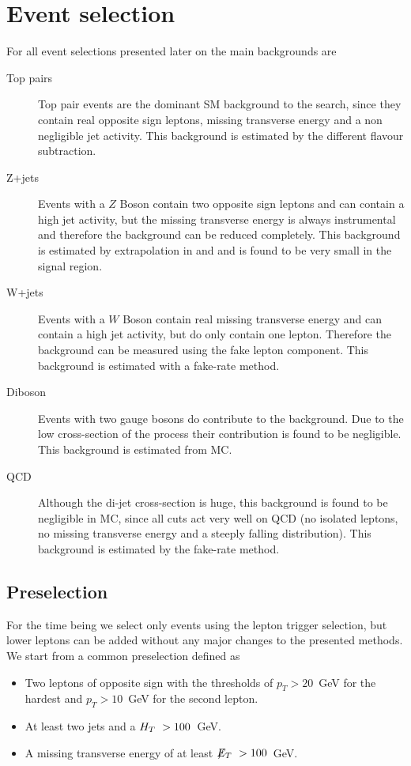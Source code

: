 \section{Event selection}\label{sec:eventselection}

For all event selections presented later on
the main backgrounds are
\begin{description}
\item[Top pairs] Top pair events are the dominant SM background to the search, 
    since they contain real opposite sign leptons, missing transverse energy and
    a non negligible jet activity. This background is estimated by the different
    flavour subtraction.
\item[Z+jets] Events with a $Z$ Boson contain two opposite sign leptons and 
    can contain a high jet activity, but the missing transverse energy is always
   instrumental and therefore the background can be reduced completely.
   This background is estimated by extrapolation in \HT and \MET
   and is found to be very small in the signal region.
\item[W+jets] Events with a $W$ Boson contain real missing transverse energy and
    can contain a high jet activity, but do only contain one lepton.
    Therefore the background can be measured using the fake lepton component.
    This background is estimated with a fake-rate method.
\item[Diboson] Events with two gauge bosons do contribute to the background.
    Due to the low cross-section of the process their contribution is found
    to be negligible. This background is estimated from MC.
\item[QCD] Although the di-jet cross-section is huge, this background is found to 
    be negligible in MC, since all cuts act very well on QCD (no isolated leptons,
    no missing transverse energy and  a steeply falling \HT distribution). 
    This background is estimated by the fake-rate method.
\end{description}

\subsection{Preselection}

For the time being we select only events using the lepton trigger selection,
but lower \pT leptons can be added without any major changes to the 
presented methods.
We start from a common preselection defined as
\begin{itemize}
\item Two leptons of opposite sign with the thresholds
of $p_T>20$~GeV for the hardest and $p_T>10$~GeV for 
the second lepton.
\item At least two jets and a $H_T~>100$~GeV.
\item A missing transverse energy of at least $\displaystyle{\not} E_T~>100$~GeV.
\end{itemize}


